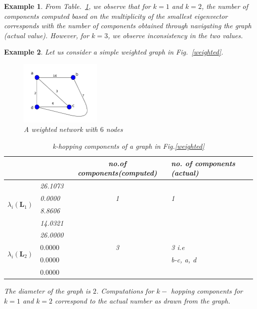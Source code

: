 \documentclass[10pt,a4paper]{article}
\newtheorem{exa}{Example}
\begin{document}
\begin{exa}
    	    	From Table.~\ref{tablecomponentsg1}, we observe that for $k=1$ and $k=2$, the number of components computed based on the multiplicity of the smallest eigenvector corresponds with the number of components obtained through navigating the graph (actual value). However, for $k=3$, we observe inconsistency in the two values.\\
    	    \end{exa}
    	    
    	    \begin{exa}
    	    	Let us consider a simple weighted graph in Fig.~\ref{weighted}.
    	    	\begin{figure}[!h]
    	    		\centering
    	    		\vspace{0pt}
    	    		\includegraphics[width= 0.35\textwidth]{images/weighted2.png}
    	    		\caption{ A weighted network with $6$ nodes} \label{weighted3}
    	    	\end{figure} 
    	    	
    	    	\begin{table}[!h]
    	    		\centering
    	    		\begin{tabular}{ |l|l|c|l| }
    	    			\hline
    	    			& & no.of components(computed) & no. of components (actual)\\
    	    			\hline
    	    			\multirow{4}{*}{$\lambda_i(\mathbf{L}_1)$} 
    	    			& 26.1073 & & \\
    	    			& 0.0000 & 1 &1 \\
    	    			& 8.8606 & & \\
    	    			& 14.0321& & \\
    	    			\hline  
    	    			\multirow{4}{*}{$\lambda_i(\mathbf{L}_2)$} 
    	    			& 26.0000& &\\
    	    			& $\mathbf{0.0000}$ &3 & 3 i.e\\
    	    			& $\mathbf{0.0000}$ & &b-c, a, d\\
    	    			& $\mathbf{0.0000}$ & & \\
    	    			\hline 
    	    		\end{tabular}   
    	    		\caption{k-hopping components of a graph in Fig.\ref{weighted}} 
    	    		\label{tablecomponentsg1}
    	    	\end{table}
    	    	The diameter of the graph is $2$. Computations for $k-$ hopping components for $k=1$ and $k=2$ correspond to the actual number as drawn from the graph.
    	    \end{exa}
    	    
\end{document}
